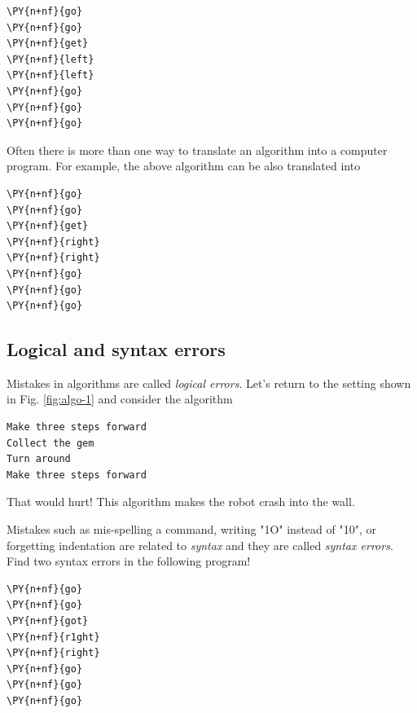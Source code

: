 \begin{bbox}
\begin{Verbatim}[commandchars=\\\{\}]
\PY{n+nf}{go}
\PY{n+nf}{go}
\PY{n+nf}{get}
\PY{n+nf}{left}
\PY{n+nf}{left}
\PY{n+nf}{go}
\PY{n+nf}{go}
\PY{n+nf}{go}
\end{Verbatim}
\end{bbox}
\vspace{6mm}

\noindent
Often there is more than one way to translate an algorithm into a computer 
program. For example, the above algorithm can be also translated into\\

\begin{bbox}
\begin{Verbatim}[commandchars=\\\{\}]
\PY{n+nf}{go}
\PY{n+nf}{go}
\PY{n+nf}{get}
\PY{n+nf}{right}
\PY{n+nf}{right}
\PY{n+nf}{go}
\PY{n+nf}{go}
\PY{n+nf}{go}
\end{Verbatim}
\end{bbox}

\subsection{Logical and syntax errors}

Mistakes in algorithms are called {\em logical errors}. Let's return to 
the setting shown in Fig. \ref{fig:algo-1} and consider the algorithm

\begin{verbatim}
Make three steps forward
Collect the gem
Turn around
Make three steps forward
\end{verbatim}
That would hurt! This algorithm makes the robot crash into the wall. 

Mistakes such as mis-spelling a command, writing "1O" instead of "10", or forgetting 
indentation are related to {\em syntax} and they are called {\em syntax errors}. Find
two syntax errors in the following program!\\

\begin{bbox}
\begin{Verbatim}[commandchars=\\\{\}]
\PY{n+nf}{go}
\PY{n+nf}{go}
\PY{n+nf}{got}
\PY{n+nf}{r1ght}
\PY{n+nf}{right}
\PY{n+nf}{go}
\PY{n+nf}{go}
\PY{n+nf}{go}
\end{Verbatim}
\end{bbox}
\vspace{6mm}

